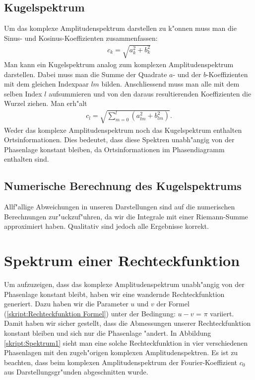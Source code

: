 \begin{refsection}
\subsection{Kugelspektrum}
%
Um das komplexe Amplitudenspektrum darstellen zu k"onnen muss man die
Sinus- und Kosinus-Koeffizienten zusammenfassen:
\begin{align*}
c_k= \sqrt{a^2_{k}+b^2_{k}}
\end{align*}
Man kann ein Kugelspektrum analog zum komplexen Amplitudenspektrum 
darstellen. 
Dabei muss man die Summe der Quadrate $a$- und der $b$-Koeffizienten mit 
dem gleichen Indexpaar $lm$ bilden. Anschliessend muss man alle 
mit dem selben Index $l$ aufsummieren und von den daraus resultierenden 
Koeffizienten die Wurzel ziehen. Man erh"alt 
\begin{align*}
c_l= \sqrt{\sum_{m=0}^l (a^2_{lm}+b^2_{lm})} .
\end{align*}
Weder das komplexe Amplitudenspektrum noch das Kugelspektrum enthalten 
Ortsinformationen. 
Dies bedeutet, dass diese Spektren unabh"angig von der
Phasenlage konstant bleiben, da Ortsinformationen im 
Phasendiagramm enthalten sind.

\subsection{Numerische Berechnung des Kugelspektrums}
Allf"allige Abweichungen in unseren Darstellungen sind auf die 
numerischen Berechnungen zur"uckzuf"uhren, da wir die Integrale  
mit einer Riemann-Summe approximiert haben.
Qualitativ sind jedoch alle Ergebnisse korrekt. 

\section{Spektrum einer Rechteckfunktion}


Um aufzuzeigen, dass das komplexe Amplitudenspektrum unabh"angig von 
der Phasenlage konstant bleibt, haben wir eine wandernde 
Rechteckfunktion generiert. 
Dazu haben wir die Parameter $u$ und $v$ der Formel 
(\ref{skript:Rechteckfunktion Formel})
unter der Bedingung: $u - v$ = $\pi$ variiert.
Damit haben wir sicher gestellt, dass die Abmessungen unserer 
Rechteckfunktion konstant bleiben und sich nur die Phasenlage "andert.
In Abbildung \ref{skript:Spektrum1} sieht man eine solche 
Rechteckfunktion in vier verschiedenen Phasenlagen mit den zugeh"origen 
komplexen Amplitudenspektren. 
Es ist zu beachten, dass beim komplexen Amplitudenspektrum der 
Fourier-Koeffizient $c_0$ aus Darstellungsgr"unden abgeschnitten wurde.


\end{refsection}
